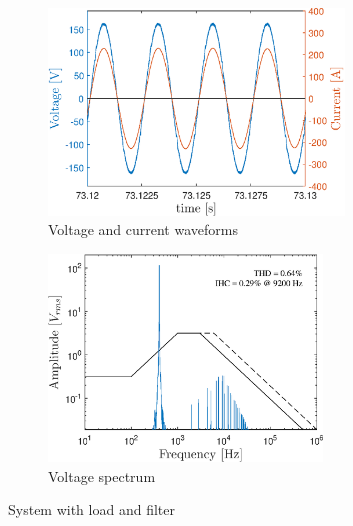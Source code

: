 \begin{doublespacing}
	\begin{figure}[!htb] %
		\centering
		\begin{subfigure}[b]{0.5\textwidth}
			\centering
			\includegraphics[height=5.5cm]{Figures/artigo_filt_3.eps}
			\caption{Voltage and current waveforms} 
			\label{fig:artigo_filt_3.eps}
		\end{subfigure}%
		\hfill
		\begin{subfigure}[b]{0.5\textwidth}  
			\centering 
			\includegraphics[height=5.5cm]{Figures/artigo_filt_4.eps}
			\caption{Voltage spectrum}    
			\label{fig:artigo_filt_4.eps}
		\end{subfigure}%
		\caption{System with load and filter}
		\label{fig:4}
	\end{figure}
	
\end{doublespacing}
	